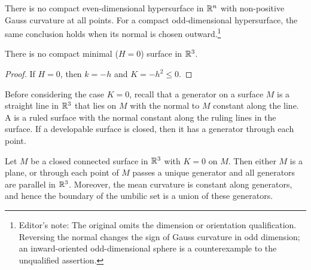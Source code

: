 \documentclass[../main]{subfiles}
\begin{document}
\begin{corollary} \label{cor:ch3.2.4}
There is no compact even-dimensional hypersurface in $\mathbb{R}^n$ with non-positive Gauss curvature at all points. For a compact odd-dimensional hypersurface, the same conclusion holds when its normal is chosen outward.\footnote{Editor's note: The original omits the dimension or orientation qualification. Reversing the normal changes the sign of Gauss curvature in odd dimension; an inward-oriented odd-dimensional sphere is a counterexample to the unqualified assertion.}
\end{corollary}



\begin{corollary} \label{cor:ch3.2.5}
There is no compact minimal ($H = 0$) surface in $\mathbb{R}^3$.
\end{corollary}

\begin{proof}
If $H = 0$, then $k = -h$ and $K = -h^2 \le 0$.
\end{proof}



Before considering the case $K = 0$, recall that a generator on a surface $M$ is a straight line in $\mathbb{R}^3$ that lies on $M$ with the normal to $M$ constant along the line. A  is a ruled surface with the normal constant along the ruling lines in the surface. If a developable surface is closed, then it has a generator through each point. 



\begin{theorem} \label{thm:ch3.2.6}
Let $M$ be a closed connected surface in $\mathbb{R}^3$ with $K = 0$ on $M$. Then either $M$ is a plane, or through each point of $M$ passes a unique generator and all generators are parallel in $\mathbb{R}^3$. Moreover, the mean curvature is constant along generators, and hence the boundary of the umbilic set is a union of these generators.
\end{theorem}
\end{document}
